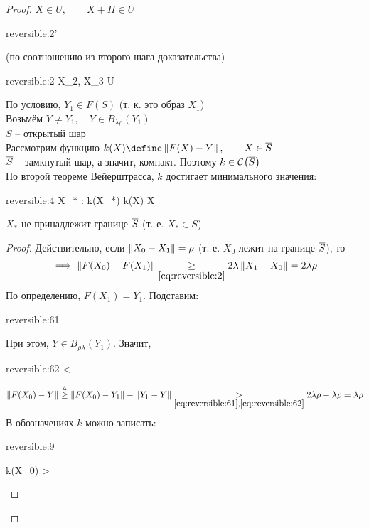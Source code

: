 \begin{proof}
	$ X \in U, \qquad X + H \in U $
	\begin{equ}{reversible:2'}
		 \lambda{}
	\end{equ}
	(по соотношению  из второго шага доказательства)
	\begin{equ}{reversible:2}
		 \iff {} \lambda{} \qquad \forall X_2, X_3 \in U
	\end{equ}
	По условию, $ Y_1 \in F(S) $ (т. к. это образ $ X_1 $) \\
	Возьмём $ Y \ne Y_1, \quad Y \in B_{\lambda\rho}(Y_1) $ \\
	$ S $ -- открытый шар \\
	Рассмотрим функцию $ k(X) \define \norm{F(X) - Y}, \qquad X \in \ol{S} $ \\
	$ \overline{S} $ -- замкнутый шар, а значит, компакт. Поэтому $ k \in \mathcal{C}^{} \big( {\overline{S}} \big)  $ \\
	По второй теореме Вейерштрасса, $ k $ достигает минимального значения:
	\begin{equ}{reversible:4}
		\exist X_* \in {} : k(X_*) \le k(X) \quad \forall X \in {}
	\end{equ}
	\begin{statement}
		$ X_* $ не принадлежит границе $ \overline{S} $ (т. е. $ X_* \in S $)
	\end{statement}
	\begin{proof}
		Действительно, если $ \left\|{X_0 - X_1}\right\| = \rho $ (т. е. $ X_0 $ лежит на границе $ \overline{S} $), то
		$$ \implies \norm{F(X_0) - F(X_1)} \underset{\eref{reversible:2}}\ge 2\lambda\norm{X_1 - X_0} = 2\lambda\rho $$
		По определению, $ F(X_1) = Y_1 $. Подставим:
		\begin{equ}{reversible:61}
			 \lambda\rho
		\end{equ}
		При этом, $ Y \in B_{\rho\lambda}(Y_1) $. Значит,
		\begin{equ}{reversible:62}
			 < \lambda\rho
		\end{equ}
		$$ \norm{F(X_0) - Y} \trige \norm{F(X_0) - Y_1} - \norm{Y_1 - Y} \underset{\eref{reversible:61}, \eref{reversible:62}}> 2\lambda\rho - \lambda\rho = \lambda\rho $$
		В обозначениях $ k $ можно записать:
		\begin{equ}{reversible:9}
			\begin{rcases}
				k(X_0)   > \lambda\rho \\

\end{rcases}
\end{equ}
\end{proof}
\end{proof}
